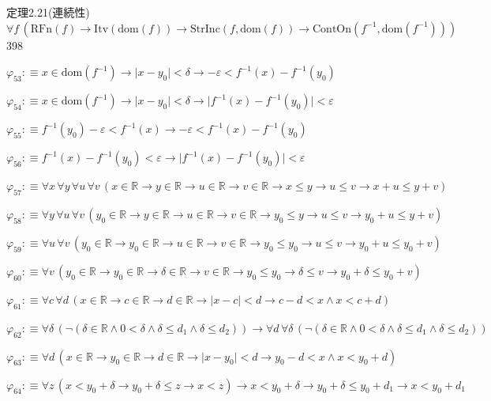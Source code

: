 \begin{fullproof}{定理2.21(連続性)}{$\forall f\,(\mathrm{RFn}(f) \to \mathrm{Itv}(\mathrm{dom}(f)) \to \mathrm{StrInc}(f,\mathrm{dom}(f)) \to \mathrm{ContOn}(f^{-1},\mathrm{dom}(f^{-1})))$}{398}
\begin{abbrevlist}
\item $\varphi_{53} :\equiv x \in \mathrm{dom}(f^{-1}) \to \lvert x - y_{0} \rvert < \delta \to -\varepsilon < f^{-1}(x) - f^{-1}(y_{0})$
\item $\varphi_{54} :\equiv x \in \mathrm{dom}(f^{-1}) \to \lvert x - y_{0} \rvert < \delta \to \lvert f^{-1}(x) - f^{-1}(y_{0}) \rvert < \varepsilon$
\item $\varphi_{55} :\equiv f^{-1}(y_{0}) - \varepsilon < f^{-1}(x) \to -\varepsilon < f^{-1}(x) - f^{-1}(y_{0})$
\item $\varphi_{56} :\equiv f^{-1}(x) - f^{-1}(y_{0}) < \varepsilon \to \lvert f^{-1}(x) - f^{-1}(y_{0}) \rvert < \varepsilon$
\item $\varphi_{57} :\equiv \forall x\,\forall y\,\forall u\,\forall v\,(x \in \mathbb{R} \to y \in \mathbb{R} \to u \in \mathbb{R} \to v \in \mathbb{R} \to x \leq y \to u \leq v \to x + u \leq y + v)$
\item $\varphi_{58} :\equiv \forall y\,\forall u\,\forall v\,(y_{0} \in \mathbb{R} \to y \in \mathbb{R} \to u \in \mathbb{R} \to v \in \mathbb{R} \to y_{0} \leq y \to u \leq v \to y_{0} + u \leq y + v)$
\item $\varphi_{59} :\equiv \forall u\,\forall v\,(y_{0} \in \mathbb{R} \to y_{0} \in \mathbb{R} \to u \in \mathbb{R} \to v \in \mathbb{R} \to y_{0} \leq y_{0} \to u \leq v \to y_{0} + u \leq y_{0} + v)$
\item $\varphi_{60} :\equiv \forall v\,(y_{0} \in \mathbb{R} \to y_{0} \in \mathbb{R} \to \delta \in \mathbb{R} \to v \in \mathbb{R} \to y_{0} \leq y_{0} \to \delta \leq v \to y_{0} + \delta \leq y_{0} + v)$
\item $\varphi_{61} :\equiv \forall c\,\forall d\,(x \in \mathbb{R} \to c \in \mathbb{R} \to d \in \mathbb{R} \to \lvert x - c \rvert < d \to c - d < x \land x < c + d)$
\item $\varphi_{62} :\equiv \forall \delta\,(\neg (\delta \in \mathbb{R} \land 0 < \delta \land \delta \leq d_{1} \land \delta \leq d_{2})) \to \forall d\,\forall \delta\,(\neg (\delta \in \mathbb{R} \land 0 < \delta \land \delta \leq d_{1} \land \delta \leq d_{2}))$
\item $\varphi_{63} :\equiv \forall d\,(x \in \mathbb{R} \to y_{0} \in \mathbb{R} \to d \in \mathbb{R} \to \lvert x - y_{0} \rvert < d \to y_{0} - d < x \land x < y_{0} + d)$
\item $\varphi_{64} :\equiv \forall z\,(x < y_{0} + \delta \to y_{0} + \delta \leq z \to x < z) \to x < y_{0} + \delta \to y_{0} + \delta \leq y_{0} + d_{1} \to x < y_{0} + d_{1}$

\end{abbrevlist}
\end{fullproof}
